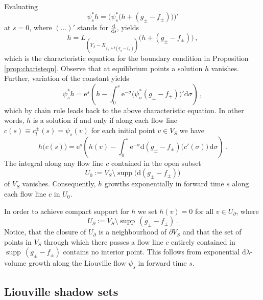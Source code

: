 \documentclass{amsart}
\theoremstyle{definition}
\newcommand{\rmd}{\mathrm d}
\newcommand{\rme}{\mathrm e}
\DeclareMathOperator{\supp}{\mathrm{supp}}
\begin{document}
Evaluating
  \[
    \psi_s^*h=
    \Big(\psi_s^*\big(h+(g_{\pm}-f_{\pm})\big)\Big)'
  \]
at $s=0$, where $(\ldots)'$ stands for $\frac{\rmd}{\rmd s}$,
yields
  \[
    h=
    L_{
      (Y_{\lambda}-X_{f_{\pm}+t(g_{\pm}-f_{\pm})})
      }
    \big(h+(g_{\pm}-f_{\pm})\big)
    \,,
  \]
which is the characteristic equation for the boundary condition
in Proposition \ref{prop:charisteqn}.
Observe that at equilibrium points a solution $h$ vanishes.
Further, variation of the constant yields
  \[
    \psi_s^*h=
    \rme^s
      \left(
        h-
        \int_0^s
          \rme^{-\sigma}
          \big(
            \psi_{\sigma}^*(g_{\pm}-f_{\pm})
          \big)'
        \rmd\sigma
    \right)
    \,,
  \]
which by chain rule leads back to the above characteristic equation.
In other words,
$h$ is a solution if and only if
along each flow line $c(s)\equiv c_t^{\pm}(s)=\psi_s(v)$
for each initial point $v\in V_S$ we have
  \[
    h\big(c(s)\big)=
    \rme^s
      \left(
        h(v)-
        \int_0^s
          \rme^{-\sigma}
          \rmd(g_{\pm}-f_{\pm})
          \big(c'(\sigma)\big)\,
        \rmd\sigma
    \right)
    \,.
  \]
The integral along any flow line $c$
contained in the open subset
\[
U_0:=
V_S\setminus\supp\!\big(\rmd(g_{\pm}-f_{\pm})\big)
\]
of $V_S$ vanishes.
Consequently,
$h$ growths exponentially in forward time $s$
along each flow line $c$ in $U_0$.

In order to achieve compact support for $h$
we set $h(v)=0$ for all $v\in U_{\partial}$,
where
\[
U_{\partial}:=
V_S\setminus\supp\,(g_{\pm}-f_{\pm})
\,.
\]
Notice, that the closure of $U_{\partial}$
is a neighbourhood of $\partial V_S$ and
that the set of points in $V_S$
through which there passes a flow line $c$
entirely contained in $\supp\,(g_{\pm}-f_{\pm})$
contains no interior point.
This follows from exponential $\rmd\lambda$-volume growth
along the Liouville flow $\psi_s$ in forward time $s$.




\subsection{Liouville shadow sets}
\label{subsec:liouvilleshadow}
\end{document}
